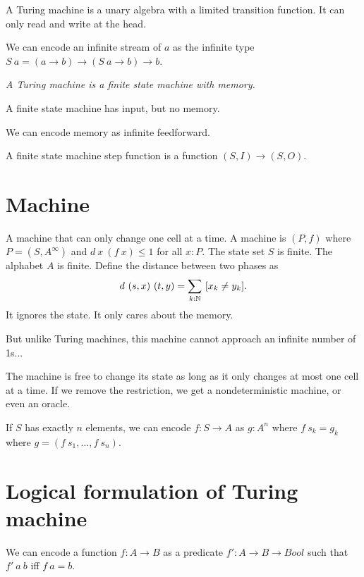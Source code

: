 A Turing machine is a unary algebra with a limited transition function.
It can only read and write at the head.

We can encode an infinite stream of \(a\)
as the infinite type \(S~a = (a \to b) \to (S~a \to b) \to b\).

\emph{A Turing machine is a finite state machine with memory.}

A finite state machine has input, but no memory.

We can encode memory as infinite feedforward.

A finite state machine step function is a function \((S,I) \to (S,O)\).

\section{Machine}

A machine that can only change one cell at a time.
A machine is
\((P, f)\)
where \(P = (S,A^\infty)\)
and
\(d~x~(f~x) \le 1\)
for all \(x : P\).
The state set \(S\) is finite.
The alphabet \(A\) is finite.
Define the distance between two phases as
\begin{align}
    d~(s,x)~(t,y) = \sum_{k : \mathbb{N}} ~ [x_k \neq y_k].
\end{align}
It ignores the state.
It only cares about the memory.

But unlike Turing machines, this machine cannot approach an infinite number of 1s...

The machine is free to change its state as long as it only changes at most one cell at a time.
If we remove the restriction, we get a nondeterministic machine,
or even an oracle.

If \(S\) has exactly \(n\) elements,
we can encode \(f : S \to A\) as \(g : A^n\)
where \(f~s_k = g_k\) where \(g = (f~s_1, \ldots, f~s_n)\).

\section{Logical formulation of Turing machine}

We can encode a function \(f : A \to B\) as a predicate \(f' : A \to B \to Bool\) such that \(f'~a~b\) iff \(f~a = b\).

